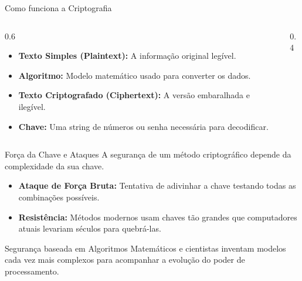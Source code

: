 \documentclass[aspectratio=169]{beamer}
\begin{document}
\begin{frame}{Como funciona a Criptografia}
    \begin{columns}
        \begin{column}{0.6\textwidth}
            \begin{itemize}
                \item \textbf{Texto Simples (Plaintext):} A informação original legível.
                \item \textbf{Algoritmo:} Modelo matemático usado para converter os dados.
                \item \textbf{Texto Criptografado (Ciphertext):} A versão embaralhada e ilegível.
                \item \textbf{Chave:} Uma string de números ou senha necessária para decodificar.
            \end{itemize}
        \end{column}
        \begin{column}{0.4\textwidth}
            \centering
        \end{column}
    \end{columns}
\end{frame}

\begin{frame}{Força da Chave e Ataques}
    A segurança de um método criptográfico depende da complexidade da sua chave.
    \begin{itemize}
        \item \textbf{Ataque de Força Bruta:} Tentativa de adivinhar a chave testando todas as combinações possíveis.
        \item \textbf{Resistência:} Métodos modernos usam chaves tão grandes que computadores atuais levariam séculos para quebrá-las.
    \end{itemize}
    \begin{alertblock}{Segurança baseada em Algoritmos}
        Matemáticos e cientistas inventam modelos cada vez mais complexos para acompanhar a evolução do poder de processamento.
    \end{alertblock}
\end{frame}
\end{document}
